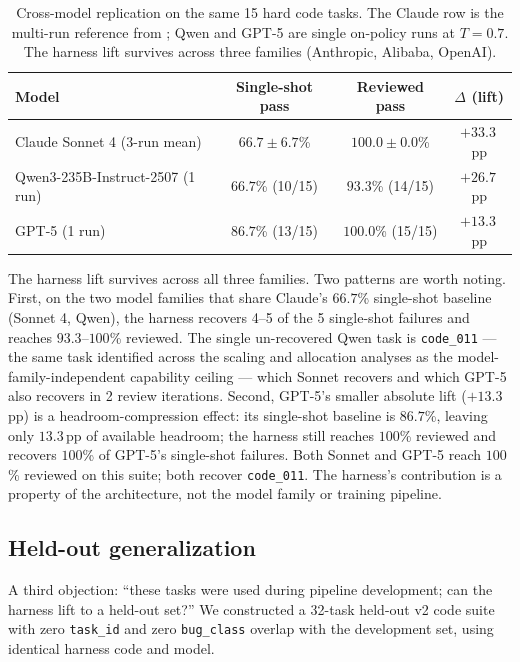 \documentclass[11pt]{article}
\begin{document}
\begin{table}[ht]
\centering
\caption{Cross-model replication on the same 15 hard code tasks. The Claude row is the multi-run reference from ; Qwen and GPT-5 are single on-policy runs at $T{=}0.7$. The harness lift survives across three families (Anthropic, Alibaba, OpenAI).}
\label{tab:crossmodel}
\small
\begin{tabular}{lccc}
\toprule
Model & Single-shot pass & Reviewed pass & $\Delta$ (lift) \\
\midrule
Claude Sonnet 4 (3-run mean)        & $66.7 \pm 6.7$\%   & $\mathbf{100.0 \pm 0.0}$\%      & $\mathbf{+33.3}$\,pp \\
Qwen3-235B-Instruct-2507 (1 run)    & $66.7$\% (10/15)   & $\mathbf{93.3}$\% (14/15)       & $\mathbf{+26.7}$\,pp \\
GPT-5 (1 run)                       & $86.7$\% (13/15)   & $\mathbf{100.0}$\% (15/15)      & $\mathbf{+13.3}$\,pp \\
\bottomrule
\end{tabular}
\end{table}

The harness lift survives across all three families. Two patterns are worth noting. First, on the two model families that share Claude's $66.7$\% single-shot baseline (Sonnet 4, Qwen), the harness recovers 4--5 of the 5 single-shot failures and reaches $93.3$--$100$\% reviewed. The single un-recovered Qwen task is \texttt{code\_011} --- the same task identified across the scaling and allocation analyses as the model-family-independent capability ceiling --- which Sonnet recovers and which GPT-5 also recovers in 2 review iterations. Second, GPT-5's smaller absolute lift ($+13.3$\,pp) is a headroom-compression effect: its single-shot baseline is $86.7$\%, leaving only $13.3$\,pp of available headroom; the harness still reaches $100$\% reviewed and recovers $100$\% of GPT-5's single-shot failures. Both Sonnet and GPT-5 reach $100$\% reviewed on this suite; both recover \texttt{code\_011}. The harness's contribution is a property of the architecture, not the model family or training pipeline.

\subsection{Held-out generalization}
\label{sec:harness-heldout}

A third objection: ``these tasks were used during pipeline development; can the harness lift to a held-out set?'' We constructed a 32-task held-out v2 code suite with zero \texttt{task\_id} and zero \texttt{bug\_class} overlap with the development set, using identical harness code and model.
\end{document}
